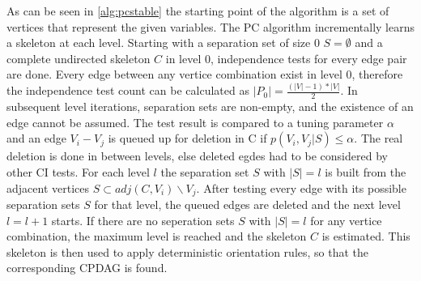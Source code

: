 As can be seen in \ref{alg:pcstable} the starting point of the algorithm is a set of vertices that represent the given variables. The PC algorithm incrementally learns a skeleton at each level. Starting with a separation set of size 0 $S = \emptyset$ and a complete undirected skeleton $C$ in level 0, independence tests for every edge pair are done. Every edge between any vertice combination exist in level 0, therefore the independence test count can be calculated as $|P_0| = \frac{(|V| - 1) * |V|}{2}$. In subsequent level iterations, separation sets are non-empty, and the existence of an edge cannot be assumed. The test result is compared to a tuning parameter $\alpha$ and an edge $V_i - V_j$ is queued up for deletion in C if $p(V_i,V_j|S) \leq \alpha$. The real deletion is done in between levels, else deleted egdes had to be considered by other CI tests. For each level $l$ the separation set $S$ with $|S| = l$ is built from the adjacent vertices $S \subset adj(C, V_i)\backslash V_j$. After testing every edge with its possible separation sets $S$ for that level, the queued edges are deleted and the next level $l=l+1$ starts. If there are no seperation sets $S$ with $|S| = l$ for any vertice combination, the maximum level is reached and the skeleton $C$ is estimated.
This skeleton is then used to apply deterministic orientation rules, so that the corresponding CPDAG is found. \cite{colomboOrderIndependentConstraintBasedCausal,kalischEstimatingHighDimensionalDirected2007,pearlIntroductionCausalInference2010,schmidtOrderIndependentConstraintBasedCausal2018}
